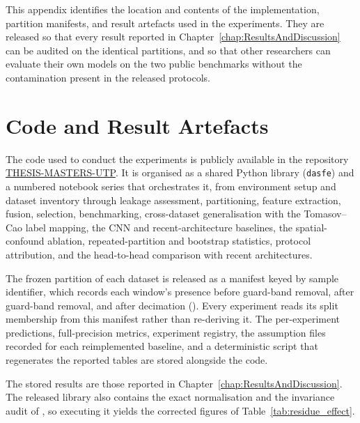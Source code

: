 This appendix identifies the location and contents of the implementation, partition manifests, and result artefacts used in the experiments. They are released so that every result reported in Chapter~\ref{chap:ResultsAndDiscussion} can be audited on the identical partitions, and so that other researchers can evaluate their own models on the two public benchmarks without the contamination present in the released protocols.

\section{Code and Result Artefacts}
\label{sec:codeAvailability}
The code used to conduct the experiments is publicly available in the repository \href{https://github.com/reeyan-afzal-khan/THESIS-MASTERS-UTP}{THESIS-MASTERS-UTP}. It is organised as a shared Python library (\texttt{dasfe}) and a numbered notebook series that orchestrates it, from environment setup and dataset inventory through leakage assessment, partitioning, feature extraction, fusion, selection, benchmarking, cross-dataset generalisation with the Tomasov--Cao label mapping, the CNN and recent-architecture baselines, the spatial-confound ablation, repeated-partition and bootstrap statistics, protocol attribution, and the head-to-head comparison with recent architectures.

The frozen partition of each dataset is released as a manifest keyed by sample identifier, which records each window's presence before guard-band removal, after guard-band removal, and after decimation (). Every experiment reads its split membership from this manifest rather than re-deriving it. The per-experiment predictions, full-precision metrics, experiment registry, the assumption files recorded for each reimplemented baseline, and a deterministic script that regenerates the reported tables are stored alongside the code.

The stored results are those reported in Chapter~\ref{chap:ResultsAndDiscussion}. The released library also contains the exact normalisation and the invariance audit of , so executing it yields the corrected figures of Table~\ref{tab:residue_effect}.
